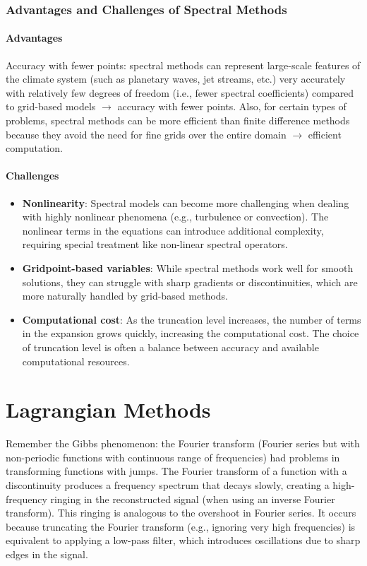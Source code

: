 \subsubsection{Advantages and Challenges of Spectral Methods}

\paragraph{Advantages}
Accuracy with fewer points: spectral methods can represent large-scale features of the climate system (such as planetary waves, jet streams, etc.) very accurately with relatively few degrees of freedom (i.e., fewer spectral coefficients) compared to grid-based models $\rightarrow$ accuracy with fewer points. Also, for certain types of problems, spectral methods can be more efficient than finite difference methods because they avoid the need for fine grids over the entire domain $\rightarrow$ efficient computation.
\paragraph{Challenges}
\begin{itemize}
	\item \textbf{Nonlinearity}: Spectral models can become more challenging when dealing with highly nonlinear phenomena (e.g., turbulence or convection). The nonlinear terms in the equations can introduce additional complexity, requiring special treatment like non-linear spectral operators.
	\item \textbf{Gridpoint-based variables}: While spectral methods work well for smooth solutions, they can struggle with sharp gradients or discontinuities, which are more naturally handled by grid-based methods.
	\item \textbf{Computational cost}: As the truncation level increases, the number of terms in the expansion grows quickly, increasing the computational cost. The choice of truncation level is often a balance between accuracy and available computational resources.
\end{itemize}



\section{Lagrangian Methods}
Remember the Gibbs phenomenon: the Fourier transform (Fourier series but with non-periodic functions with continuous range of frequencies) had problems in
transforming functions with jumps.
The Fourier transform of a function with a discontinuity produces a frequency spectrum that decays slowly, creating a high-frequency ringing in the reconstructed signal (when using an inverse Fourier transform).
This ringing is analogous to the overshoot in Fourier series. It occurs because truncating the Fourier transform (e.g., ignoring very high frequencies) is equivalent to applying a low-pass filter, which introduces oscillations due to sharp edges in the signal.


